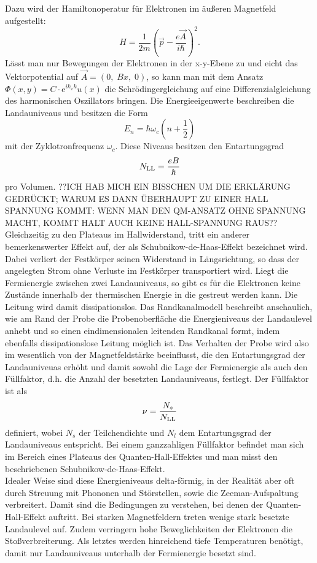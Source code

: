 \documentclass[paper=a4,fontsize=10pt,DIV=18,twocolumn,parskip=half]{scrartcl}
\numberwithin{equation}{section}    %
\begin{document}
Dazu wird der Hamiltonoperatur für Elektronen im äußeren Magnetfeld aufgestellt:
\begin{equation}
H=\frac{1}{2 m} (\vec{p} - \frac{e \vec{A}}{i \hbar})^2.
\end{equation}
Lässt man nur Bewegungen der Elektronen in der x-y-Ebene zu und eicht das Vektorpotential auf  $\vec{A}= (0, \; B x, \; 0)$, so kann man mit dem Ansatz $\Phi(x,y)=C \cdot \mathrm{e}^{i k_x k} u(x)$ die Schrödingergleichung auf eine Differenzialgleichung des harmonischen Oszillators bringen.
Die Energieeigenwerte beschreiben die Landauniveaus und besitzen die Form
\begin{equation}
E_n=\hbar \omega_c (n+\frac{1}{2})
\end{equation}
mit der Zyklotronfrequenz $\omega_c$. Diese Niveaus besitzen den Entartungsgrad
\begin{equation}
N_{\rm LL}= \frac{e B}{\hbar}
\end{equation}
pro Volumen. ??ICH HAB MICH EIN BISSCHEN UM DIE ERKLÄRUNG GEDRÜCKT; WARUM ES DANN ÜBERHAUPT ZU EINER HALL SPANNUNG KOMMT: WENN MAN DEN QM-ANSATZ OHNE SPANNUNG MACHT, KOMMT HALT AUCH KEINE HALL-SPANNUNG RAUS?? \\
Gleichzeitig zu den Plateaus im Hallwiderstand, tritt ein anderer bemerkenswerter Effekt auf, der als Schubnikow-de-Haas-Effekt bezeichnet wird. Dabei verliert der Festkörper seinen Widerstand in Längsrichtung, so dass der angelegten Strom ohne Verluste im Festkörper transportiert wird. Liegt die Fermienergie zwischen zwei Landauniveaus, so gibt es für die Elektronen keine Zustände innerhalb der thermischen Energie in die gestreut werden kann. Die Leitung wird damit dissipationslos. Das Randkanalmodell beschreibt anschaulich, wie am Rand der Probe die Probenoberfläche die Energieniveaus der Landaulevel anhebt und so einen eindimensionalen leitenden Randkanal formt, indem ebenfalls dissipationslose Leitung möglich ist.
Das Verhalten der Probe wird also im wesentlich von der Magnetfeldstärke beeinflusst, die den Entartungsgrad der Landauniveuas erhöht und damit sowohl die Lage der Fermienergie als auch den Füllfaktor, d.h. die Anzahl der besetzten Landauniveaus, festlegt. Der Füllfaktor ist als
\begin{equation}
\nu=\frac{N_s}{N_{\rm LL}}
\end{equation}
definiert, wobei $N_s$ der Teilchendichte und $N_l$ dem Entartungsgrad der Landauniveaus entspricht. Bei einem ganzzahligen Füllfaktor befindet man sich im Bereich eines Plateaus des Quanten-Hall-Effektes und man misst den beschriebenen Schubnikow-de-Haas-Effekt.\\
Idealer Weise sind diese Energieniveaus delta-förmig, in der Realität aber oft durch Streuung mit Phononen und Störstellen, sowie die Zeeman-Aufspaltung verbreitert. Damit sind die Bedingungen zu verstehen, bei denen der Quanten-Hall-Effekt auftritt. Bei starken Magnetfeldern treten wenige stark besetzte Landaulevel auf. Zudem verringern hohe Beweglichkeiten der Elektronen die Stoßverbreiterung. Als letztes werden hinreichend tiefe Temperaturen benötigt, damit nur Landauniveaus unterhalb der Fermienergie besetzt sind.\\
\end{document}
